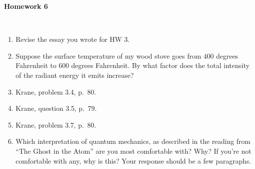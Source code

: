 
\oddsidemargin=0in
\textwidth=6.75in

\renewcommand{\arraystretch}{1.3}


\pagestyle{empty}

\begin{center}
{\Large {\bf Homework 6}}
\end{center}
\hspace{1cm}\\

\begin{enumerate}

\item Revise the essay you wrote for HW 3. 

\item Suppose the surface temperature of my wood stove goes from $400$ 
degrees Fahrenheit to $600$ degrees Fahrenheit.  By what factor does
the total intensity of the radiant energy it emits increase?

\item Krane, problem 3.4, p.~80.

\item Krane, question 3.5, p.~79.

\item Krane, problem 3.7, p.~80.

\item Which interpretation of quantum mechanics, as described in the
reading from ``The Ghost in the Atom'' are you most comfortable with?
Why?  If you're not comfortable with any, why is this?  Your response
should be a few paragraphs.  





\end{enumerate}





